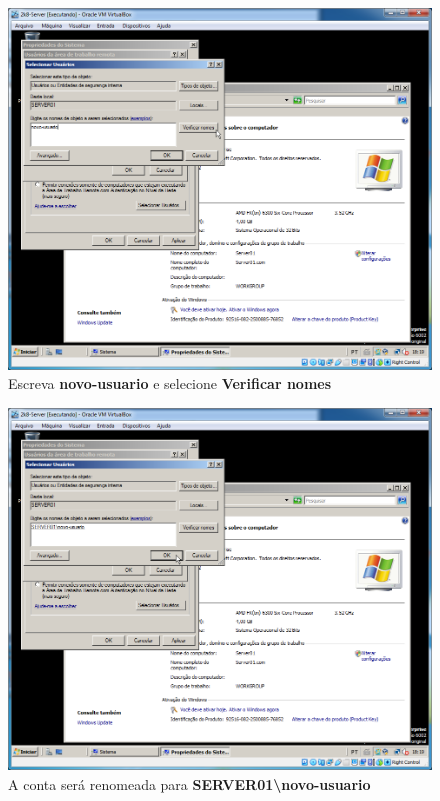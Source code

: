 \documentclass[10pt]{article}
\begin{document}
\begin{figure}[H]
    \centering
    \caption{Escreva \textbf{novo-usuario} e selecione \textbf{Verificar nomes}}
    \label{fig:ar017}
    \includegraphics[width=\linewidth]{images/acesso_remoto/ar017.png}
\end{figure}
\begin{figure}[H]
    \centering
    \caption{A conta será renomeada para \textbf{SERVER01\textbackslash novo-usuario}}
    \label{fig:ar018}
    \includegraphics[width=\linewidth]{images/acesso_remoto/ar018.png}
\end{figure}
\end{document}
